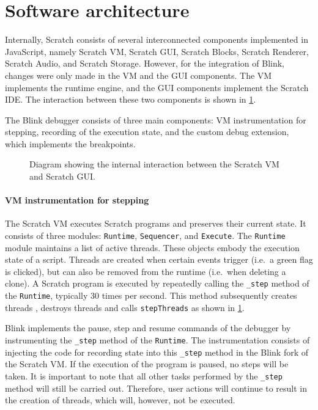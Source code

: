 \documentclass[../main]{subfiles}
\begin{document}
\section{Software architecture}\label{sec:blink-software-architecture}

Internally, Scratch consists of several interconnected components implemented in JavaScript, namely Scratch VM, Scratch GUI, Scratch Blocks, Scratch Renderer, Scratch Audio, and Scratch Storage.
However, for the integration of Blink, changes were only made in the VM and the GUI components.
The VM implements the runtime engine, and the GUI components implement the Scratch IDE\@.
The interaction between these two components is shown in \cref{fig:blink-architecture}.

The Blink debugger consists of three main components: VM instrumentation for stepping, recording of the execution state, and the custom debug extension, which implements the breakpoints.

\begin{figure}
    
    \caption{
        Diagram showing the internal interaction between the Scratch VM and Scratch GUI\@.
    }
    \label{fig:blink-architecture}
\end{figure}

\paragraph{VM instrumentation for stepping}

The Scratch VM executes Scratch programs and preserves their current state.
It consists of three modules: \texttt{Runtime}, \texttt{Sequencer}, and \texttt{Execute}.
The \texttt{Runtime} module maintains a list of active threads.
These objects embody the execution state of a script.
Threads are created when certain events trigger (i.e.\ a green flag is clicked), but can also be removed from the runtime (i.e.\ when deleting a clone).
A Scratch program is executed by repeatedly calling the \texttt{\_step} method of the \texttt{Runtime}, typically 30 times per second.
This method subsequently creates threads , destroys threads  and calls \texttt{stepThreads}  as shown in \cref{fig:blink-architecture}.

Blink implements the pause, step and resume commands of the debugger by instrumenting the \texttt{\_step} method of the \texttt{Runtime}.
The instrumentation consists of injecting the code for recording state into this \texttt{\_step} method in the Blink fork of the Scratch VM\@.
If the execution of the program is paused, no steps will be taken.
It is important to note that all other tasks performed by the \texttt{\_step} method will still be carried out.
Therefore, user actions will continue to result in the creation of threads, which will, however, not be executed.
\end{document}
